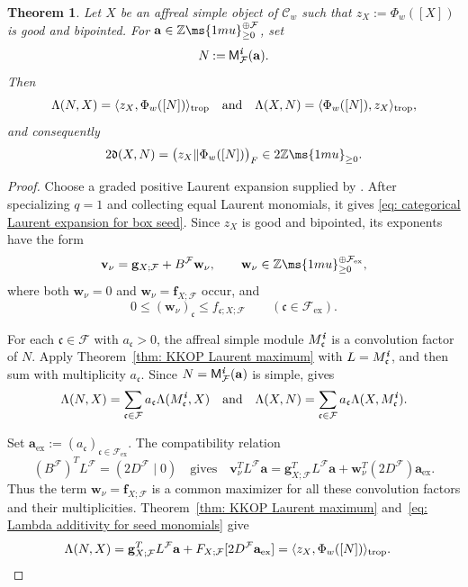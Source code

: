 \documentclass[12pt, leqno]{amsart}
\numberwithin{equation}{section}
\theoremstyle{plain}
\newtheorem{theorem}[lemma]{Theorem}
\theoremstyle{definition}
\newcommand{\seteq}{\mathbin{:=}}
\newcommand{\ex}{\mathrm{ex}}
\newcommand{\Z}{\mathbb{Z}\ms{1mu}}
\newcommand{\trop}{{\rm trop}}
\newcommand{\de}{\mathfrak{d}}
\newcommand{\ii}{ \textbf{\textit{i}}}
\newcommand{\frakc}{\mathfrak{c}}
\newcommand{\sfM}{\mathsf{M}}
\newcommand{\bfa}{\mathbf{a}}
\newcommand{\bff}{\mathbf{f}}
\newcommand{\bfg}{\mathbf{g}}
\newcommand{\bfv}{\mathbf{v}}
\newcommand{\bfw}{\mathbf{w}}
\newcommand{\calF}{\mathcal{F}}
\newcommand{\scrC}{\mathscr{C}}
\newcommand{\qtq}[1][{and}]{\quad\text{{#1}}\quad}
\begin{document}
\begin{theorem}\label{thm: categorical interpretation of F-invariant}
 Let \(X\) be an affreal simple object of \(\scrC_w\) such that
\(z_X\seteq\Phi_w([X])\) is good and bipointed.  For
\(\bfa\in\Z_{\geq0}^{\oplus\calF}\), set
\[
N\seteq\sfM^\ii_\calF(\bfa).
\]
Then
\[
\Lambda(N,X) = \langle z_X,\Phi_w([N])\rangle_{\trop}
\qtq
\Lambda(X,N) = \langle\Phi_w([N]),z_X\rangle_{\trop},
\]
and consequently
\[
2\de(X,N) = \bigl(z_X\Vert\Phi_w([N])\bigr)_F
\in2\Z_{\geq0}.
\]
\end{theorem}

\begin{proof}
Choose a graded positive Laurent expansion supplied by
\cite[Corollary~3.4]{KKOP23F}.   After specializing \(q=1\) and
collecting equal Laurent monomials, it gives
\eqref{eq: categorical Laurent expansion for box seed}.    
Since \(z_X\) is good and bipointed, its exponents have the form
\[
\bfv_\nu
=
\bfg_{X;\calF}+B^\calF\bfw_\nu,
\qquad
\bfw_\nu\in\Z_{\geq0}^{\oplus\calF_{\ex}},
\]
where both \(\bfw_\nu=0\) and
\(\bfw_\nu=\bff_{X;\calF}\) occur, and
\[
0\leq(\bfw_\nu)_\frakc
\leq f_{\frakc;X;\calF}
\qquad(\frakc\in\calF_{\ex}).
\]

For each \(\frakc\in\calF\) with \(a_\frakc>0\), the affreal
simple module \(M_\frakc^\ii\) is a convolution factor of \(N\).
Apply Theorem~\ref{thm: KKOP Laurent maximum} with
\(L=M_\frakc^\ii\), and then sum with multiplicity
\(a_\frakc\).  Since \(N=\sfM^\ii_\calF(\bfa)\) is simple,
\cite[Proposition~2.6]{KKOP26} gives
\begin{equation}\label{eq: Lambda additivity for seed monomials}
\Lambda(N,X)
=
\sum_{\frakc\in\calF}
a_\frakc\Lambda(M_\frakc^\ii,X) \qtq 
\Lambda(X,N)
=
\sum_{\frakc\in\calF}
a_\frakc\Lambda(X,M_\frakc^\ii).
\end{equation} 

Set
\(\bfa_{\ex}\seteq (a_\frakc)_{\frakc\in\calF_{\ex}}\). 
The compatibility relation
\[
(B^\calF)^TL^\calF=(2D^\calF\mid0)
\quad
\text{gives}
\quad 
\bfv_\nu^TL^\calF\bfa
=
\bfg_{X;\calF}^TL^\calF\bfa
+\bfw_\nu^T(2D^\calF)\bfa_{\ex}.
\]
Thus the term \(\bfw_\nu=\bff_{X;\calF}\) is a common
maximizer for all these convolution factors and their
multiplicities.  Theorem~\ref{thm: KKOP Laurent maximum}
and~\eqref{eq: Lambda additivity for seed monomials} give
\begin{align}\label{eq: Lambda N X as tropical invariant}
\Lambda(N,X)
&=
\bfg_{X;\calF}^TL^\calF\bfa
+F_{X;\calF}[2D^\calF\bfa_{\ex}]
=
\langle z_X,\Phi_w([N])\rangle_{\trop}.
\end{align}


\end{proof}
\end{document}
